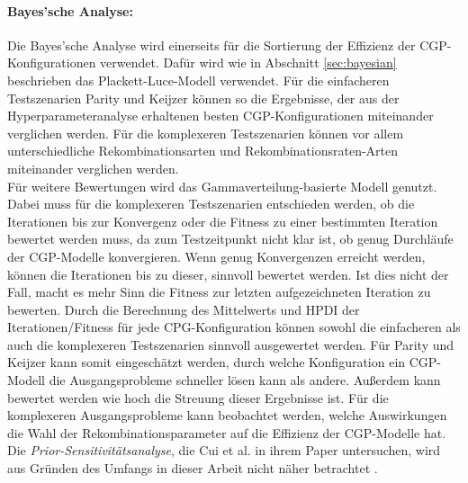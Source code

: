 \paragraph{Bayes'sche Analyse:} Die Bayes'sche Analyse wird einerseits für die Sortierung der Effizienz der CGP-Konfigurationen verwendet. 
Dafür wird wie in Abschnitt \ref{sec:bayesian} beschrieben das Plackett-Luce-Modell verwendet.
Für die einfacheren Testszenarien Parity und Keijzer können so die Ergebnisse, der aus der Hyperparameteranalyse erhaltenen besten CGP-Konfigurationen miteinander verglichen werden.
Für die komplexeren Testszenarien können vor allem unterschiedliche Rekombinationsarten und Rekombinationsraten-Arten miteinander verglichen werden.\\
Für weitere Bewertungen wird das Gammaverteilung-basierte Modell genutzt. Dabei muss für die komplexeren Testszenarien entschieden werden, ob die Iterationen bis zur Konvergenz oder die Fitness zu einer bestimmten Iteration bewertet werden muss, da zum Testzeitpunkt nicht klar ist, ob genug Durchläufe der CGP-Modelle konvergieren.
Wenn genug Konvergenzen erreicht werden, können die Iterationen bis zu dieser, sinnvoll bewertet werden.
Ist dies nicht der Fall, macht es mehr Sinn die Fitness zur letzten aufgezeichneten Iteration zu bewerten.
Durch die Berechnung des Mittelwerts und HPDI der Iterationen/Fitness für jede CPG-Konfiguration können sowohl die einfacheren als auch die komplexeren Testszenarien sinnvoll ausgewertet werden.
Für Parity und Keijzer kann somit eingeschätzt werden, durch welche Konfiguration ein CGP-Modell die Ausgangsprobleme schneller lösen kann als andere.
Außerdem kann bewertet werden wie hoch die Streuung dieser Ergebnisse ist.
Für die komplexeren Ausgangsprobleme kann beobachtet werden, welche Auswirkungen die Wahl der Rekombinationsparameter auf die Effizienz der CGP-Modelle hat.\\
Die \emph{Prior-Sensitivitätsanalyse}, die Cui et al. in ihrem Paper untersuchen, wird aus Gründen des Umfangs in dieser Arbeit nicht näher betrachtet \cite{cui_equidistant_2023}.

